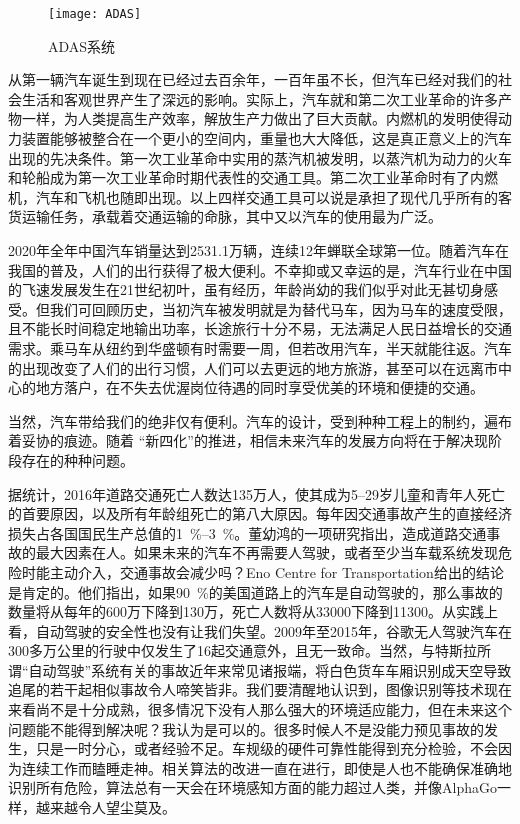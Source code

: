 \documentclass[UTF8]{ctexart}
\numberwithin{figure}{section}
\numberwithin{table}{section}
\begin{document}
\begin{figure}[htbp]
	\centering
	\begin{minipage}[b]{\textwidth}
		\centering
		\texttt{[image: ADAS]}
		\caption{ADAS系统}
		\label{ADAS}
	\end{minipage}
\end{figure}

从第一辆汽车诞生到现在已经过去百余年，一百年虽不长，但汽车已经对我们的社会生活和客观世界产生了深远的影响。实际上，汽车就和第二次工业革命的许多产物一样，为人类提高生产效率，解放生产力做出了巨大贡献。内燃机的发明使得动力装置能够被整合在一个更小的空间内，重量也大大降低，这是真正意义上的汽车出现的先决条件。第一次工业革命中实用的蒸汽机被发明，以蒸汽机为动力的火车和轮船成为第一次工业革命时期代表性的交通工具。第二次工业革命时有了内燃机，汽车和飞机也随即出现。以上四样交通工具可以说是承担了现代几乎所有的客货运输任务，承载着交通运输的命脉，其中又以汽车的使用最为广泛。

2020年全年中国汽车销量达到2531.1万辆，连续12年蝉联全球第一位。随着汽车在我国的普及，人们的出行获得了极大便利。不幸抑或又幸运的是，汽车行业在中国的飞速发展发生在21世纪初叶，虽有经历，年龄尚幼的我们似乎对此无甚切身感受。但我们可回顾历史，当初汽车被发明就是为替代马车，因为马车的速度受限，且不能长时间稳定地输出功率，长途旅行十分不易，无法满足人民日益增长的交通需求。乘马车从纽约到华盛顿有时需要一周，但若改用汽车，半天就能往返。汽车的出现改变了人们的出行习惯，人们可以去更远的地方旅游，甚至可以在远离市中心的地方落户，在不失去优渥岗位待遇的同时享受优美的环境和便捷的交通。

当然，汽车带给我们的绝非仅有便利。汽车的设计，受到种种工程上的制约，遍布着妥协的痕迹。随着 “新四化”的推进，相信未来汽车的发展方向将在于解决现阶段存在的种种问题。

据统计，2016年道路交通死亡人数达135万人，使其成为\numrange[range-phrase = $\,\sim\,$]{5}{29}岁儿童和青年人死亡的首要原因，以及所有年龄组死亡的第八大原因。每年因交通事故产生的直接经济损失占各国国民生产总值的\qtyrange[range-phrase = $\,\sim\,$, range-units = single]{1}{3}{\percent}。董幼鸿的一项研究指出，造成道路交通事故的最大因素在人。如果未来的汽车不再需要人驾驶，或者至少当车载系统发现危险时能主动介入，交通事故会减少吗？Eno Centre for Transportation给出的结论是肯定的。他们指出，如果\SI{90}{\percent}的美国道路上的汽车是自动驾驶的，那么事故的数量将从每年的600万下降到130万，死亡人数将从\num[group-separator={,}]{33000}下降到\num[group-separator={,}]{11300}。从实践上看，自动驾驶的安全性也没有让我们失望。2009年至2015年，谷歌无人驾驶汽车在300多万公里的行驶中仅发生了16起交通意外，且无一致命。当然，与特斯拉所谓“自动驾驶”系统有关的事故近年来常见诸报端，将白色货车车厢识别成天空导致追尾的若干起相似事故令人啼笑皆非。我们要清醒地认识到，图像识别等技术现在来看尚不是十分成熟，很多情况下没有人那么强大的环境适应能力，但在未来这个问题能不能得到解决呢？我认为是可以的。很多时候人不是没能力预见事故的发生，只是一时分心，或者经验不足。车规级的硬件可靠性能得到充分检验，不会因为连续工作而瞌睡走神。相关算法的改进一直在进行，即使是人也不能确保准确地识别所有危险，算法总有一天会在环境感知方面的能力超过人类，并像AlphaGo一样，越来越令人望尘莫及。
\end{document}
